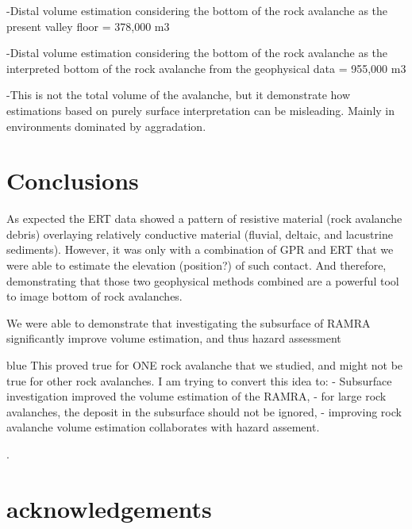 \documentclass[5p]{elsarticle}
\newcommand{\COMON}{\begin{color}{blue}}
\newcommand{\COMOFF}{\end{color}}
\begin{document}
-Distal volume estimation considering the bottom of the rock avalanche as the present valley floor =  378,000 m3

-Distal volume estimation considering the bottom of the rock avalanche as the interpreted bottom of the rock avalanche from the geophysical data = 955,000 m3 

-This is not the total volume of the avalanche, but it demonstrate how estimations based on purely surface interpretation can be misleading. Mainly in environments dominated by aggradation. 


\bigskip  


\section{Conclusions}


As expected the ERT data showed a pattern of resistive material (rock avalanche debris) overlaying relatively conductive material (fluvial, deltaic, and lacustrine sediments). However, it was only with a combination of GPR and ERT that we were able to estimate the elevation (position?) of such contact. And therefore, demonstrating that those two geophysical methods combined are a powerful tool to image bottom of rock avalanches.  

We were able to demonstrate that investigating the subsurface of RAMRA significantly improve volume estimation, and thus hazard assessment 
     
     \COMON 
     This proved true for ONE rock avalanche that we studied, and might not be true for other rock avalanches. I am trying to convert this idea to:
     - Subsurface investigation improved the volume estimation of the RAMRA,
     - for large rock avalanches, the deposit in the subsurface should not be ignored,
     - improving rock avalanche volume estimation collaborates with hazard assement. 
      \COMOFF. 

	


\section{acknowledgements}







\end{document}
